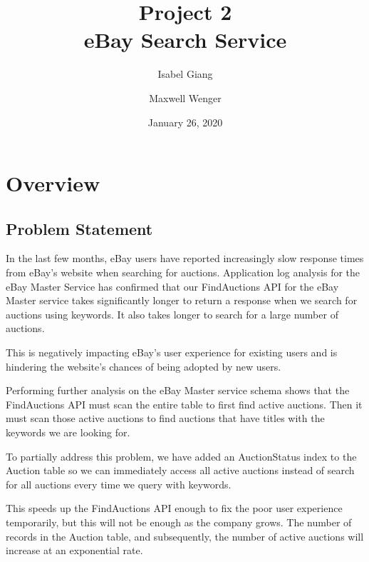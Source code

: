 \documentclass[12pt,a4paper]{article}
\title{Project 2 \\ eBay Search Service}
\author{Isabel Giang}
\author{Maxwell Wenger}
\affil{CSS490 Group Y4}
\date{January 26, 2020}
\begin{document}
\maketitle
\tableofcontents



\section{Overview}
\subsection{Problem Statement}
In the last few months, eBay users have reported increasingly slow response times from eBay's website when searching for auctions. Application log analysis for the eBay Master Service has confirmed that our FindAuctions API for the eBay Master service takes significantly longer to return a response when we search for auctions using keywords. It also takes longer to search for a large number of auctions.

This is negatively impacting eBay's user experience for existing users and is hindering the website's chances of being adopted by new users.

Performing further analysis on the eBay Master service schema shows that the FindAuctions API must scan the entire table to first find active auctions. Then it must scan those active auctions to find auctions that have titles with the keywords we are looking for.

To partially address this problem, we have added an AuctionStatus index to the Auction table so we can immediately access all active auctions instead of search for all auctions every time we query with keywords. 

This speeds up the FindAuctions API enough to fix the poor user experience temporarily, but this will not be enough as the company grows. The number of records in the Auction table, and subsequently, the number of active auctions will increase at an exponential rate.
\end{document}
